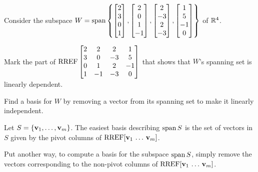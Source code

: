 \begin{applicationActivities}
\begin{activity}{10}
  Consider the subspace \(W=\operatorname{span}\left\{
  \begin{bmatrix}2\\3\\0\\1\end{bmatrix},
  \begin{bmatrix}2\\0\\1\\-1\end{bmatrix},
  \begin{bmatrix}2\\-3\\2\\-3\end{bmatrix},
  \begin{bmatrix}1\\5\\-1\\0\end{bmatrix}
  \right\}
  \) of \(\mathbb{R}^4\).

  \begin{subactivity}
    Mark the part of \(\operatorname{RREF}\begin{bmatrix}
    2&2&2&1\\
    3&0&-3&5\\
    0&1&2&-1\\
    1&-1&-3&0
    \end{bmatrix}\) that shows that \(W\)'s spanning set
    is linearly dependent.
  \end{subactivity}

  \begin{subactivity}
    Find a basis for \(W\) by removing a vector from its spanning set
    to make it linearly independent.
  \end{subactivity}
\end{activity}

\begin{fact}
  Let \(S=\{\mathbf v_1,\dots,\mathbf v_m\}\). The easiest basis describing
  \(\operatorname{span} S\) is the set of vectors in \(S\) given by the pivot columns
  of \(\operatorname{RREF}[\mathbf v_1\,\dots\,\mathbf v_m]\).

  \vspace{1em}

  Put another way, to compute a basis for the subspace \(\operatorname{span} S\),
  simply remove the vectors corresponding to the non-pivot columns of
  \(\operatorname{RREF}[\mathbf v_1\,\dots\,\mathbf v_m]\).
\end{fact}


\end{applicationActivities}
